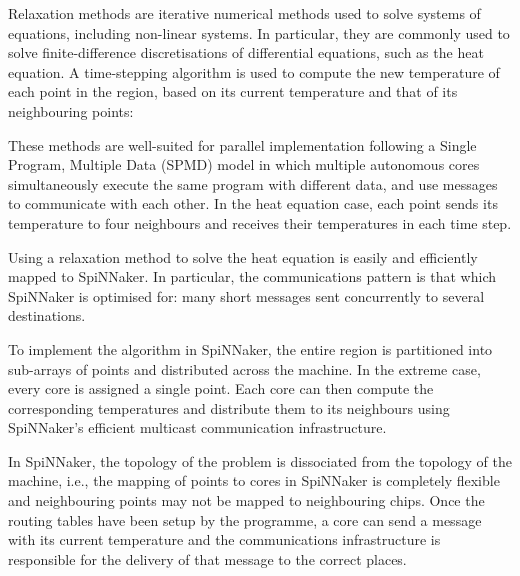 \documentclass[a4paper, 11pt]{article}
\begin{document}
Relaxation methods are iterative numerical methods used to solve systems of equations, including non-linear systems. In particular, they are commonly used to solve finite-difference discretisations of differential equations, such as the heat equation. A time-stepping algorithm is used to compute the new temperature of each point in the region, based on its current temperature and that of its neighbouring points:

%

These methods are well-suited for parallel implementation following a Single Program, Multiple Data (SPMD) model in which multiple autonomous cores simultaneously execute the same program with different data, and use messages to communicate with each other. In the heat equation case, each point sends its temperature to four neighbours and receives their temperatures in each time step.

Using a relaxation method to solve the heat equation is easily and efficiently mapped to SpiNNaker. In particular, the communications pattern is that which SpiNNaker is optimised for: many short messages sent concurrently to several destinations.

To implement the algorithm in SpiNNaker, the entire region is partitioned into sub-arrays of points and distributed across the machine. In the extreme case, every core is assigned a single point. Each core can then compute the corresponding temperatures and distribute them to its neighbours using SpiNNaker's efficient multicast communication infrastructure.

In SpiNNaker, the topology of the problem is dissociated from the topology of the machine, i.e., the mapping of points to cores in SpiNNaker is completely flexible and neighbouring points may not be mapped to neighbouring chips. Once the routing tables have been setup by the programme, a core can send a message with its current temperature and the communications infrastructure is responsible for the delivery of that message to the correct places.
\end{document}
